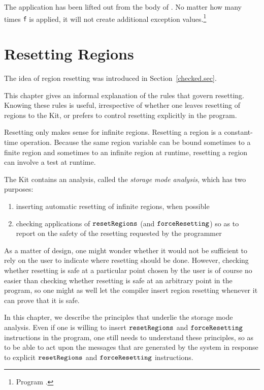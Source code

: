 \documentclass[12pt]{book}
\begin{document}
The application  has been lifted out from the body of
. No matter how many times {\tt f} is applied, it will not
create additional exception values.\footnote{Program
  .}

\chapter{Resetting Regions}
\label{storagemodes.sec}
The idea of region resetting was introduced in
Section~\ref{checked.sec}.
%

This chapter gives an informal explanation of the rules that govern
resetting. Knowing these rules is useful, irrespective of whether one
leaves resetting of regions to the Kit, or prefers to control
resetting explicitly in the program.

Resetting only makes sense for infinite regions.  Resetting a region
is a constant-time operation.  Because the same region variable can be
bound sometimes to a finite region and sometimes to an infinite region
at runtime, resetting a region can involve a test at runtime.

The Kit contains an analysis, called the {\em storage mode analysis},
which has two purposes:
\begin{enumerate}
\item inserting automatic resetting of infinite regions, when possible
\item checking applications of $\hbox{\tt resetRegions}$ (and
  $\hbox{\tt forceResetting}$) so as to report on the safety of the resetting requested
  by the programmer
\end{enumerate}

As a matter of design, one might wonder whether it would not be
sufficient to rely on the user to indicate where resetting should be
done. However, checking whether resetting is safe at a particular
point chosen by the user is of course no easier than checking whether
resetting is safe at an arbitrary point in the program, so one might
as well let the compiler insert region resetting whenever it can prove
that it is safe.

In this chapter, we describe the principles that underlie the storage
mode analysis. Even if one is willing to insert $\hbox{\tt resetRegions}$ and
$\hbox{\tt forceResetting}$ instructions in the program, one still needs to understand
these principles, so as to be able to act upon the messages that are
generated by the system in response to explicit $\hbox{\tt resetRegions}$ and
$\hbox{\tt forceResetting}$ instructions.
\end{document}
